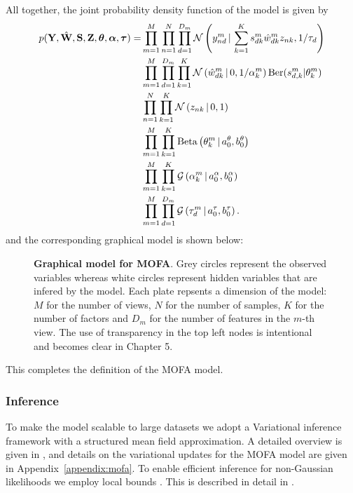 All together, the joint probability density function of the model is given by
\begin{align}
	\begin{split}
	p({\bf Y},\hat{{\bf W}},{\bf S},{\bf Z},\mbox{\boldmath $\theta$}, \mbox{\boldmath $\alpha$}, \mbox{\boldmath $\tau$})  = &\prod_{m=1}^{M} \prod_{n=1}^{N} \prod_{d=1}^{D_m} \mathcal{N}\left(y_{nd}^m \,|\, \sum_{k=1}^{K} s_{dk}^m \hat{w}_{dk}^m z_{nk},1/\tau_d\right) \\
	& \prod_{m=1}^{M}\prod_{d=1}^{D_m} \prod_{k=1}^{K} \mathcal{N}\left(\hat{w}_{dk}^m \,|\, 0,1/\alpha_k^m\right) \text{Ber}(s_{d,k}^m|\theta_k^m) \\
	& \prod_{n=1}^{N} \prod_{k=1}^{K} \mathcal{N}\left(z_{nk} \,|\, 0,1\right) \\
	& \prod_{m=1}^{M} \prod_{k=1}^{K} \text{Beta}\left(\theta_k^m \,|\, a_0^\theta,b_0^\theta\right) \\
	& \prod_{m=1}^{M} \prod_{k=1}^{K} \mathcal{G}\left(\alpha_k^m \,|\, a_0^\alpha, b_0^\alpha\right) \\
	& \prod_{m=1}^{M} \prod_{d=1}^{D_m} \mathcal{G}\left(\tau_d^m \,|\, a_0^\tau,b_0^\tau\right).
	\label{likelihood}
	\end{split}
\end{align}
and the corresponding graphical model is shown below:

\begin{figure}[H]
 	\begin{center}
	
	\caption{\textbf{Graphical model for MOFA}. Grey circles represent the observed variables whereas white circles represent hidden variables that are infered by the model. Each plate repsents a dimension of the model: $M$ for the number of views, $N$ for the number of samples, $K$ for the number of factors and $D_m$ for the number of features in the $m$-th view. The use of transparency in the top left nodes is intentional and becomes clear in Chapter 5.}
	\end{center}
\end{figure}

This completes the definition of the MOFA model.

\subsubsection{Inference}

To make the model scalable to large datasets we adopt a Variational inference framework with a structured mean field approximation. A detailed overview is given in , and details on the variational updates for the MOFA model are given in Appendix~\ref{appendix:mofa}. To enable efficient inference for non-Gaussian likelihoods we employ local bounds \cite{Jaakkola2000,Seeger2012}. This is described in detail in .

